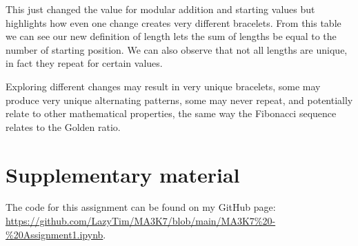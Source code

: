 \documentclass[11pt]{article}
\begin{document}
This just changed the value for modular addition and starting values but highlights how even one change creates very different bracelets. From this table we can see our new definition of length lets the sum of lengths be equal to the number of starting position. We can also observe that not all lengths are unique, in fact they repeat for certain values.

Exploring different changes may result in very unique bracelets, some may produce very unique alternating patterns, some may never repeat, and potentially relate to other mathematical properties, the same way the Fibonacci sequence relates to the Golden ratio.


\section*{Supplementary material}
The code for this assignment can be found on my GitHub page:  \url{https://github.com/LazyTim/MA3K7/blob/main/MA3K7%20-%20Assignment1.ipynb}.
\end{document}
